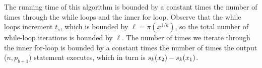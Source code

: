 \documentclass[11pt]{amsart}
\numberwithin{equation}{section}
\numberwithin{algorithm}{section}
\begin{document}

The running time of this algorithm is bounded by a constant
times the number of times through the while loops and the
inner for loop.
Observe that the while loops increment $t_s$, which is bounded
  by $\ell = \pi(x^{1/k})$,
  so the total number of while-loop iterations is bounded by $\ell$.
The number of times we iterate through the inner for-loop is bounded by
a constant times the number of times the output ($n,p_{b+1})$
statement executes, which in turn is
${s_k}(x_2)-{s_k}(x_1)$.
\end{document}
